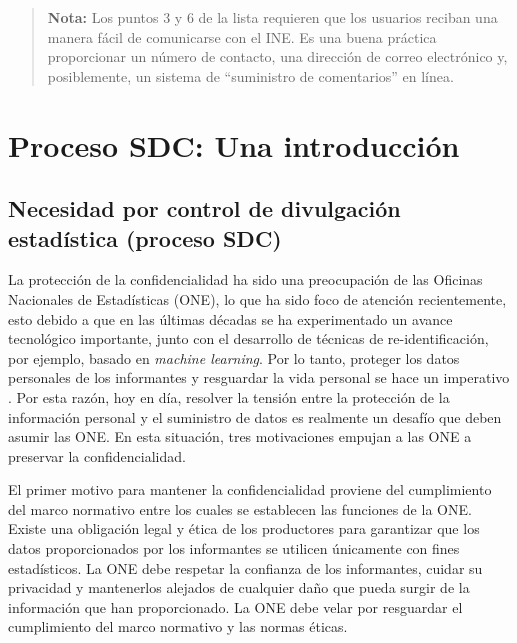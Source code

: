 \documentclass[
]{book}
\theoremstyle{definition}
\theoremstyle{definition}
\theoremstyle{definition}
\theoremstyle{definition}
\theoremstyle{remark}
\begin{document}
\begin{quote}
\textbf{Nota:} Los puntos 3 y 6 de la lista requieren que los usuarios reciban una manera fácil de comunicarse con el INE. Es una buena práctica proporcionar un número de contacto, una dirección de correo electrónico y, posiblemente, un sistema de ``suministro de comentarios'' en línea.
\end{quote}

\hypertarget{proceso-sdc-una-introducciuxf3n}{%
\chapter{Proceso SDC: Una introducción}\label{proceso-sdc-una-introducciuxf3n}}

\hypertarget{necesidad-por-control-de-divulgaciuxf3n-estaduxedstica-proceso-sdc}{%
\section{Necesidad por control de divulgación estadística (proceso SDC)}\label{necesidad-por-control-de-divulgaciuxf3n-estaduxedstica-proceso-sdc}}

La protección de la confidencialidad ha sido una preocupación de las Oficinas Nacionales de Estadísticas (ONE), lo que ha sido foco de atención recientemente, esto debido a que en las últimas décadas se ha experimentado un avance tecnológico importante, junto con el desarrollo de técnicas de re-identificación, por ejemplo, basado en \emph{machine learning}. Por lo tanto, proteger los datos personales de los informantes y resguardar la vida personal se hace un imperativo \citep{Yazdani}. Por esta razón, hoy en día, resolver la tensión entre la protección de la información personal y el suministro de datos es realmente un desafío que deben asumir las ONE. En esta situación, tres motivaciones empujan a las ONE a preservar la confidencialidad.

El primer motivo para mantener la confidencialidad proviene del cumplimiento del marco normativo entre los cuales se establecen las funciones de la ONE. Existe una obligación legal y ética de los productores para garantizar que los datos proporcionados por los informantes se utilicen únicamente con fines estadísticos. La ONE debe respetar la confianza de los informantes, cuidar su privacidad y mantenerlos alejados de cualquier daño que pueda surgir de la información que han proporcionado. La ONE debe velar por resguardar el cumplimiento del marco normativo y las normas éticas.
\end{document}

